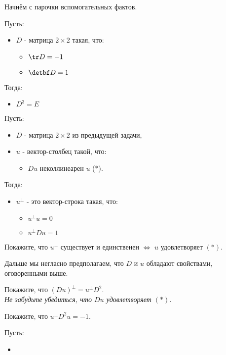 	Начнём с парочки вспомогательных фактов.
	
	\begin{problem}
		Пусть:
		\begin{itemize}
			\item $D$ - матрица $2 \times 2$ такая, что:
			\begin{itemize}
				\item $\tr D = -1$
				\item $\detbf D = 1$
			\end{itemize}
		\end{itemize}
		Тогда:
		\begin{itemize}
			\item $D^3 = E$
		\end{itemize}
	\end{problem}

	\begin{definition}
		Пусть:
		\begin{itemize}
			\item $D$ - матрица $2 \times 2$ из предыдущей задачи,
			\item $u$ - вектор-столбец такой, что:
			\begin{itemize}
				\item $Du$ неколлинеарен $u$ \signed {} ($*$).
			\end{itemize}
		\end{itemize}
		Тогда:
		\begin{itemize}
			\item $u^\bot$ - это вектор-строка такая, что:
			\begin{itemize}
				\item $u^\bot u = 0$
				\item $u^\bot D u = 1$
			\end{itemize}
		\end{itemize}
	\end{definition}

	\begin{problem}
		Покажите, что $u^\bot$ существует и единственен $\iff$ $u$ удовлетворяет $(*)$.
	\end{problem}

	Дальше мы негласно предполагаем, что $D$ и $u$ обладают свойствами, оговоренными выше.

	\begin{problem}
		Покажите, что $(Du)^\bot = u^\bot D^2$. 
	\\ \textit {Не забудьте убедиться, что $Du$ удовлетворяет $(*)$.}
	\end{problem}

	\begin{problem}
		Покажите, что $u^\bot D^2 u = -1$.
	\end{problem}

	\begin{problem}
		Пусть:
		\begin{itemize}
			\item 
		\end{itemize}
	\end{problem}
